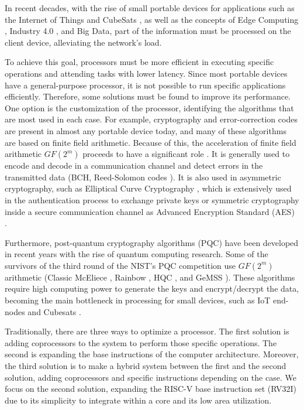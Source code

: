 In recent decades, with the rise of small portable devices for applications such as the Internet of Things \cite{5579543}
and CubeSats \cite{heidt2000cubesat}, as well as the concepts of Edge Computing \cite{7488250}, Industry 4.0 \cite{lasi2014industry}, 
and Big Data, part of the information must be processed on the client device, alleviating the network's load.

To achieve this goal, processors must be more efficient in executing specific operations and attending tasks with lower latency. 
Since most portable devices have a general-purpose processor, it is not possible to run specific applications efficiently. 
Therefore, some solutions must be found to improve its performance. One option is the customization of the processor, 
identifying the algorithms that are most used in each case. For example, cryptography and 
error-correction codes are present in almost any portable device today, and many of these algorithms are based on finite field arithmetic.  
Because of this, the acceleration of finite field arithmetic $GF(2^m)$ proceeds to have a significant role \cite{8192501}. 
It is generally used to encode and decode in a communication channel and detect errors in the transmitted data 
(BCH, Reed-Solomon codes \cite{wicker1999reed}). It is also used in asymmetric cryptography, such as Elliptical Curve Cryptography \cite{washington2008elliptic}, 
which is extensively used in the authentication process to exchange private keys or symmetric cryptography 
inside a secure communication channel as Advanced Encryption Standard (AES) \cite{heron2009advanced}.


Furthermore, post-quantum cryptography algorithms (PQC) \cite{8791343} have been developed in recent years 
with the rise of quantum computing research. Some of the survivors of the third round of the NIST's PQC competition \cite{moody2016post} 
use $GF(2^m)$ arithmetic (Classic McEliece \cite{bernstein2017classic}, Rainbow \cite{10.1007/11496137_12}, HQC \cite{melchor2018hamming}, and GeMSS \cite{casanova2017gemss}). 
These algorithms require high computing power to generate the keys and encrypt/decrypt the data, 
becoming the main bottleneck in processing for small devices, such as IoT end-nodes \cite{McGinthy2018} and Cubesats \cite{Maheshwarappa2017}.


Traditionally, there are three ways to optimize a processor. The first solution is adding coprocessors 
to the system to perform those specific operations. The second is expanding the base instructions 
of the computer architecture. Moreover, the third solution is to make a hybrid system \cite{4352011} between the first and 
the second solution, adding coprocessors and specific instructions depending on the case. 
We focus on the second solution, expanding the RISC-V base instruction set (RV32I) due to its simplicity to integrate within a core and its low area utilization. 



